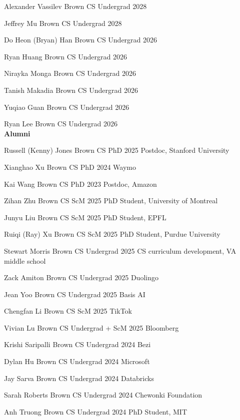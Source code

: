 \documentclass[line,margin]{res}
\begin{document}
\begin{resume}
\student
{Alexander Vassilev}
{Brown CS Undergrad}
{2028}

\student
{Jeffrey Mu}
{Brown CS Undergrad}
{2028}

\student
{Do Heon (Bryan) Han}
{Brown CS Undergrad}
{2026}

\student
{Ryan Huang}
{Brown CS Undergrad}
{2026}

\student
{Nirayka Monga}
{Brown CS Undergrad}
{2026}

\student
{Tanish Makadia}
{Brown CS Undergrad}
{2026}

\student
{Yuqiao Guan}
{Brown CS Undergrad}
{2026}

\student
{Ryan Lee}
{Brown CS Undergrad}
{2026}
\\


\textbf{Alumni}

\alumni
{Russell (Kenny) Jones}
{Brown CS PhD}
{2025}
{Postdoc, Stanford University}

\alumni
{Xianghao Xu}
{Brown CS PhD}
{2024}
{Waymo}

\alumni
{Kai Wang}
{Brown CS PhD}
{2023}
{Postdoc, Amazon}

\alumni
{Zihan Zhu}
{Brown CS ScM}
{2025}
{PhD Student, University of Montreal}

\alumni
{Junyu Liu}
{Brown CS ScM}
{2025}
{PhD Student, EPFL}

\alumni
{Ruiqi (Ray) Xu}
{Brown CS ScM}
{2025}
{PhD Student, Purdue University}

\alumni
{Stewart Morris}
{Brown CS Undergrad}
{2025}
{CS curriculum development, VA middle school}

\alumni
{Zack Amiton}
{Brown CS Undergrad}
{2025}
{Duolingo}

\alumni
{Jean Yoo}
{Brown CS Undergrad}
{2025}
{Basis AI}

\alumni
{Chengfan Li}
{Brown CS ScM}
{2025}
{TikTok}

\alumni
{Vivian Lu}
{Brown CS Undergrad + ScM}
{2025}
{Bloomberg}

\alumni
{Krishi Saripalli}
{Brown CS Undergrad}
{2024}
{Bezi}

\alumni
{Dylan Hu}
{Brown CS Undergrad}
{2024}
{Microsoft}

\alumni
{Jay Sarva}
{Brown CS Undergrad}
{2024}
{Databricks}

\alumni
{Sarah Roberts}
{Brown CS Undergrad}
{2024}
{Chewonki Foundation}

\alumni
{Anh Truong}
{Brown CS Undergrad}
{2024}
{PhD Student, MIT}


\end{resume}
\end{document}
